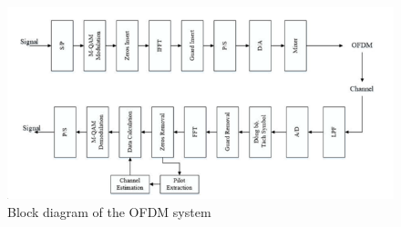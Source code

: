 \begin{figure}[htbp]
    \centering
    \includegraphics[width=\textwidth]{Figures/Block-diagram}
    \caption{Block diagram of the OFDM system}
    \label{Block diagram}    
\end{figure}

